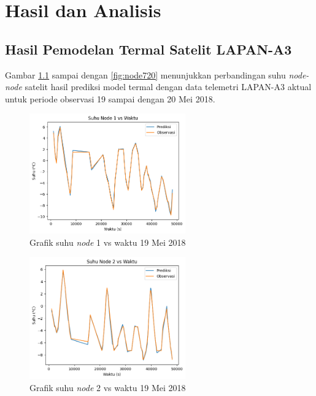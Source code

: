 \chapter{Hasil dan Analisis}

\section{Hasil Pemodelan Termal Satelit LAPAN-A3}

Gambar \ref{fig:node119} sampai dengan \ref{fig:node720} menunjukkan perbandingan suhu \textit{node-node} satelit
hasil prediksi model termal dengan data telemetri LAPAN-A3 aktual untuk periode observasi 19 sampai dengan 20 Mei 2018.

\begin{figure}[H]
\setlength{}
\begin{center}
\includegraphics[width=0.6\textwidth]{fig/node1_temp_2018-05-19.png}
	\caption{Grafik suhu \textit{node} 1 vs waktu 19 Mei 2018}
\label{fig:node119}
\end{center}
\end{figure}

\begin{figure}[H]
\setlength{}
\begin{center}
\includegraphics[width=0.6\textwidth]{fig/node2_temp_2018-05-19.png}
	\caption{Grafik suhu \textit{node} 2 vs waktu 19 Mei 2018}
\label{fig:node219}
\end{center}
\end{figure}

